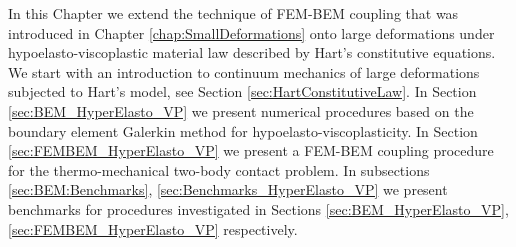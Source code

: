 \def \benchmarkTensileTest{/home/gein/Documents/tex/papers/paper_A.boundary.element.method.for.viscoplasticity/benchmark}

\def \benchmarkMetalChipping{/home/gein/Documents/tex/SPP1180/Kolloquium.7_8.Juni}
In this Chapter we extend the technique of FEM-BEM coupling that was introduced in Chapter \ref{chap:SmallDeformations} onto  large deformations under hypoelasto-viscoplastic material law described by Hart's  constitutive equations. We start with an introduction to continuum mechanics of large deformations subjected to  Hart's model, see Section \ref{sec:HartConstitutiveLaw}. In Section \ref{sec:BEM_HyperElasto_VP} we present numerical procedures based on the  boundary element Galerkin method for hypoelasto-viscoplasticity. In Section \ref{sec:FEMBEM_HyperElasto_VP} we present a FEM-BEM coupling procedure for the thermo-mechanical two-body contact problem. In subsections \ref{sec:BEM:Benchmarks}, \ref{sec:Benchmarks_HyperElasto_VP} we present benchmarks for procedures investigated in Sections \ref{sec:BEM_HyperElasto_VP}, \ref{sec:FEMBEM_HyperElasto_VP} respectively.
